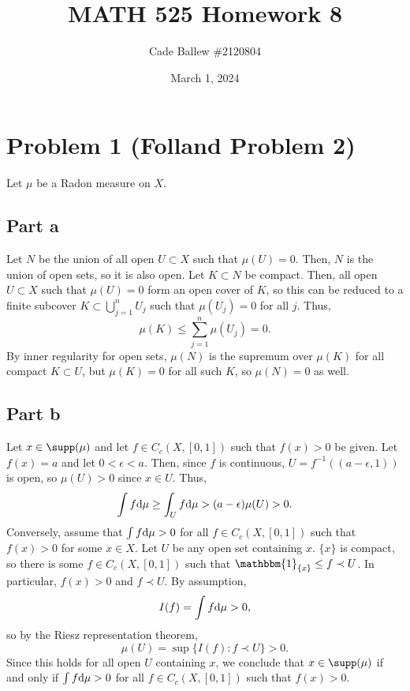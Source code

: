 \documentclass{article}
\title{MATH 525 Homework 8}
\author{Cade Ballew \#2120804}
\date{March 1, 2024}
\begin{document}
	
\maketitle
	
\section{Problem 1 (Folland Problem 2)}
Let $\mu$ be a Radon measure on $X$. 
\subsection{Part a}
Let $N$ be the union of all open $U\subset X$ such that $\mu(U)=0$. Then, $N$ is the union of open sets, so it is also open. Let $K\subset N$ be compact. Then, all open $U\subset X$ such that $\mu(U)=0$ form an open cover of $K$, so this can be reduced to a finite subcover $K\subset\bigcup_{j=1}^nU_j$ such that $\mu(U_j)=0$ for all $j$. Thus, 
\[
\mu(K)\leq\sum_{j=1}^{n}\mu(U_j)=0.
\]
By inner regularity for open sets, $\mu(N)$ is the supremum over $\mu(K)$ for all compact $K\subset U$, but $\mu(K)=0$ for all such $K$, so $\mu(N)=0$ as well.

\subsection{Part b}
Let $x\in\supp(\mu)$ and let $f\in C_c(X,[0,1])$ such that $f(x)>0$ be given. Let $f(x)=a$ and let $0<\epsilon<a$. Then, since $f$ is continuous, $U=f^{-1}\left((a-\epsilon,1)\right)$ is open, so $\mu(U)>0$ since $x\in U$. Thus,
\[
\int f\mathrm{d}\mu\geq\int_Uf\mathrm{d}\mu>(a-\epsilon)\mu(U)>0.
\]
Conversely, assume that $\int f\mathrm{d}\mu>0$ for all $f\in C_c(X,[0,1])$ such that $f(x)>0$ for some $x\in X$. Let $U$ be any open set containing $x$. $\{x\}$ is compact, so there is some $f\in C_c(X,[0,1])$ such that $\mathbbm{1}_{\{x\}}\leq f\prec U$. In particular, $f(x)>0$ and $f\prec U$. By assumption,
\[
I(f)=\int f\mathrm{d}\mu>0,
\]
so by the Riesz representation theorem,
\[
\mu(U)=\sup\{I(f):f\prec U\}>0.
\]
Since this holds for all open $U$ containing $x$, we conclude that $x\in\supp(\mu)$ if and only if $\int f\mathrm{d}\mu>0$ for all $f\in C_c(X,[0,1])$ such that $f(x)>0$.
\end{document}
